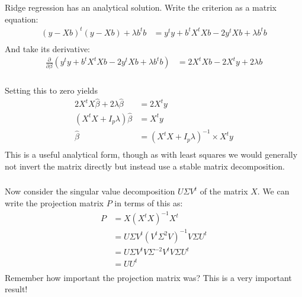 \begin{frame}[fragile] \frametitle{}

Ridge regression has an analytical solution. Write the criterion
as a matrix equation:
\begin{align*}
(y - Xb)^t (y - Xb)  + \lambda b^t b
&= y^t y + b^t X^t X b - 2 y^t X b + \lambda b^t b \\
\end{align*}
\pause And take its derivative:
\begin{align*}
\frac{\partial}{\partial \beta} \left( y^t y + b^t X^t X b - 2 y^t X b + \lambda b^t b \right)
&= 2 X^t X b - 2 X^t y + 2 \lambda b
\end{align*}

\end{frame}

\begin{frame}[fragile] \frametitle{}

Setting this to zero yields
\begin{align*}
2 X^t X \widehat{\beta} + 2 \lambda \widehat{\beta} &= 2 X^t y \\
(X^t X + I_p \lambda) \widehat{\beta} &=  X^t y \\
\widehat{\beta} &= (X^t X + I_p \lambda)^{-1} \times X^t y \\
\end{align*}
\pause This is a useful analytical form, though as with least
squares we would generally not invert the matrix directly but
instead use a stable matrix decomposition.

\end{frame}

\begin{frame}[fragile] \frametitle{}

Now consider the singular value decomposition $U\Sigma V^t$ of
the matrix $X$. We can write the projection matrix $P$ in terms
of this as:
\begin{align*}
P &= X (X^t X)^{-1} X^t \\
&= U \Sigma V^t (V^t \Sigma^2 V)^{-1} V \Sigma U^t \\
&= U \Sigma V^t V \Sigma^{-2} V^t V \Sigma U^t \\
&= U U^t \\
\end{align*}
\pause Remember how important the projection matrix was? This is
a very important result!

\end{frame}

